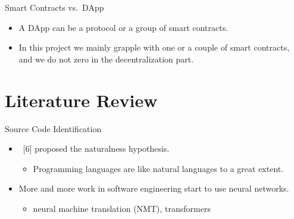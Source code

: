 \documentclass[xcolor=svgnames]{beamer}
\begin{document}
\begin{frame}[t]{Smart Contracts vs.\ DApp}
\begin{itemize}
\begin{onlyenv}
\begin{figure}
\end{figure}
\end{onlyenv}

\item<3-> A DApp can be a protocol or a group of smart contracts.
\item<4-> In this project we mainly grapple with one or a couple of smart contracts, and we do not zero in the decentralization part.
\end{itemize}

\end{frame}



\section{Literature Review}
\begin{frame}{Source Code Identification}

\begin{itemize}
\item {}~[6] proposed the naturalness hypothesis.
\begin{itemize}
\item Programming languages are like natural languages to a great extent.
\end{itemize}

\item  More and more work in software engineering start to use neural networks.
\begin{itemize}
\item neural machine translation (NMT), transformers
\end{itemize}
\end{itemize}
\end{frame}
\end{document}
